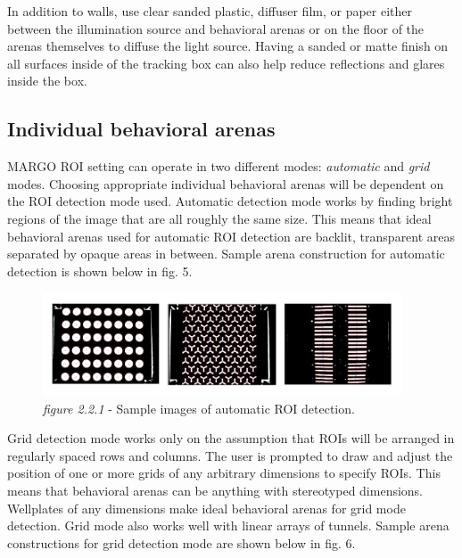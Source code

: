 \documentclass[11pt]{article}
\begin{document}
In addition to walls, use clear sanded plastic, diffuser film, or paper either between the illumination source and behavioral arenas or on the floor of the arenas themselves to diffuse the light source. Having a sanded or matte finish on all surfaces inside of the tracking box can also help reduce reflections and glares inside the box.


\hypertarget{arenasection}{\subsection{Individual behavioral arenas}}

MARGO ROI setting can operate in two different modes: \textit{automatic} and \textit{grid} modes. Choosing appropriate individual behavioral arenas will be dependent on the  ROI detection mode used. Automatic detection mode works by finding bright regions of the image that are all roughly the same size. This means that ideal behavioral arenas used for automatic ROI detection are backlit, transparent areas separated by opaque areas in between. Sample arena construction for automatic detection is shown below in fig. 5.

\begin{figure}[h!]
	\begin{center}
		\includegraphics[width=0.95\textwidth]{images/Hardware Setup/Behavioral Arenas/autoROI_detection.pdf}
		\caption*{\footnotesize {\textit{figure 2.2.1} - Sample images of automatic ROI detection.}}
	\end{center}
\end{figure}

Grid detection mode works only on the assumption that ROIs will be arranged in regularly spaced rows and columns. The user is prompted to draw and adjust the position of one or more grids of any arbitrary dimensions to specify ROIs. This means that behavioral arenas can be anything with stereotyped dimensions. Wellplates of any dimensions make ideal behavioral arenas for grid mode detection. Grid mode also works well with linear arrays of tunnels. Sample arena constructions for grid detection mode are shown below in fig. 6.
\end{document}
